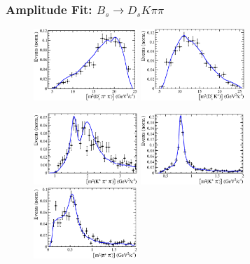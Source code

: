 \documentclass{beamer}
\begin{document}
\begin{frame}
	\frametitle{Amplitude Fit: $B_s \to D_s K \pi \pi$}

	\centering
	
	\begin{figure}[hp]
	\centering
		\includegraphics[width=0.35\textwidth, height = 3.cm]{plots/s_Dspipi.eps} 
		\includegraphics[width=0.35\textwidth, height = 3.cm]{plots/s_DsK.eps} 

		\includegraphics[width=0.35\textwidth, height = 3.cm]{plots/s_Kpipi.eps} 
		\includegraphics[width=0.35\textwidth, height = 3.cm]{plots/s_Kpi.eps} 
		\includegraphics[width=0.35\textwidth, height = 3.cm]{plots/s_pipi.eps} 		
	\end{figure}				
\end{frame}
\end{document}
